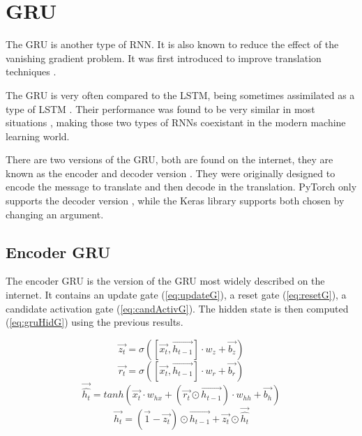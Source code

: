 \section{\acl{GRU}}\label{sec:gru}
The \acf{GRU} is another type of \ac{RNN}. It is also known to reduce the effect of the vanishing gradient problem. It was first introduced to improve translation techniques \cite{gru}.

The \ac{GRU} is very often compared to the \ac{LSTM}, being sometimes assimilated as a type of \ac{LSTM} \cite{nbLSTM}. Their performance was found to be very similar in most situations \cite{gruVSlstm}, making those two types of \acp{RNN} coexistant in the modern machine learning world.

There are two versions of the \ac{GRU}, both are found on the internet, they are known as the encoder and decoder version \cite{gru}. They were originally designed to encode the message to translate and then decode in the translation. PyTorch only supports the decoder version \cite{gruPyTorch}, while the Keras library supports both \cite{gruKeras} chosen by changing an argument.

\subsection{Encoder \ac{GRU}}

The encoder \ac{GRU} is the version of the \ac{GRU} most widely described on the internet. It contains an update gate (\cref{eq:updateG}), a reset gate (\cref{eq:resetG}), a candidate activation gate (\cref{eq:candActivG}). The hidden state is then computed (\cref{eq:gruHidG}) using the previous results.

\begin{equation}\label{eq:updateG}
  \overrightarrow{z_t}=\sigma ([\overrightarrow{x_t},\overrightarrow{h_{t-1}}] \cdot w_z + \overrightarrow{b_z})
\end{equation}
\begin{equation}\label{eq:resetG}
  \overrightarrow{r_t}=\sigma ([\overrightarrow{x_t},\overrightarrow{h_{t-1}}] \cdot w_r + \overrightarrow{b_r})
\end{equation}
\begin{equation}\label{eq:candActivG}
  \overrightarrow{\hat{h_t}}=tanh(\overrightarrow{x_t}\cdot w_{hx}+(\overrightarrow{r_t}\odot\overrightarrow{h_{t-1}}) \cdot w_{hh} + \overrightarrow{b_h})
\end{equation}
\begin{equation}\label{eq:gruHidG}
  \overrightarrow{h_t}=(\overrightarrow{1}-\overrightarrow{z_t})\odot \overrightarrow{h_{t-1}} + \overrightarrow{z_t}\odot \overrightarrow{\hat{h_t}}
\end{equation}

